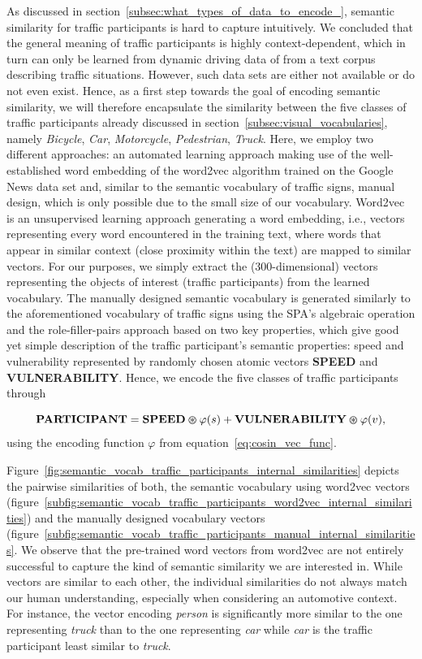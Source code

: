 As discussed in section~\ref{subsec:what_types_of_data_to_encode_}, semantic similarity for traffic participants is hard to capture intuitively.
We concluded that the general meaning of traffic participants is highly context-dependent, which in turn can only be learned from dynamic driving data of from a text corpus describing traffic situations.
However, such data sets are either not available or do not even exist.
Hence, as a first step towards the goal of encoding semantic similarity, we will therefore encapsulate the similarity between the five classes of traffic participants already discussed in section~\ref{subsec:visual_vocabularies}, namely \emph{Bicycle}, \emph{Car}, \emph{Motorcycle}, \emph{Pedestrian}, \emph{Truck}.
Here, we employ two different approaches: an automated learning approach making use of the well-established word embedding of the word2vec algorithm \parencite{Mikolov2013} trained on the Google News data set and, similar to the semantic vocabulary of traffic signs, manual design, which is only possible due to the small size of our vocabulary.
Word2vec is an unsupervised learning approach generating a word embedding, i.e., vectors representing every word encountered in the training text, where words that appear in similar context (close proximity within the text) are mapped to similar vectors. 
For our purposes, we simply extract the (\num{300}-dimensional) vectors representing the objects of interest (traffic participants) from the learned vocabulary.
The manually designed semantic vocabulary is generated similarly to the aforementioned vocabulary of traffic signs using the \ac{SPA}'s algebraic operation and the role-filler-pairs approach based on two key properties, which give good yet simple description of the traffic participant's semantic properties: speed and vulnerability represented by randomly chosen atomic vectors \textbf{SPEED} and \textbf{VULNERABILITY}.
Hence, we encode the five classes of traffic participants through

\begin{equation}
\label{eq:semantic_vocab_traffic_participants}
\mathbf{PARTICIPANT} = \mathbf{SPEED} \varoast \varphi(s) + \mathbf{VULNERABILITY} \varoast \varphi(v),
\end{equation}
using the encoding function $\varphi$ from equation~\eqref{eq:cosin_vec_func}.

Figure~\ref{fig:semantic_vocab_traffic_participants_internal_similarities} depicts the pairwise similarities of both, the semantic vocabulary using word2vec vectors (figure~\ref{subfig:semantic_vocab_traffic_participants_word2vec_internal_similarities}) and the manually designed vocabulary vectors (figure~\ref{subfig:semantic_vocab_traffic_participants_manual_internal_similarities}.
We observe that the pre-trained word vectors from word2vec are not entirely successful to capture the kind of semantic similarity we are interested in.
While vectors are similar to each other, the individual similarities do not always match our human understanding, especially when considering an automotive context.
For instance, the vector encoding \emph{person} is significantly more similar to the one representing \emph{truck} than to the one representing \emph{car} while \emph{car} is the traffic participant least similar to \emph{truck}. 

